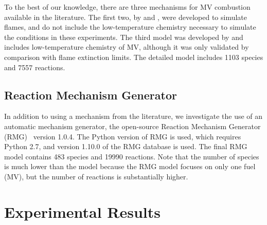 \documentclass[12pt]{../ussci}
\begin{document}
To the best of our knowledge, there are three mechanisms for MV combustion
available in the literature. The first two, by \textcite{Korobeinichev2015} and
\textcite{Dmitriev2015}, were developed to simulate flames, and do not include
the low-temperature chemistry necessary to simulate the conditions in these
experiments. The third model was developed by \textcite{Dievart2013} and
includes low-temperature chemistry of MV, although it was only validated by
comparison with flame extinction limits.
The detailed \textcite{Dievart2013} model includes 1103 species and 7557
reactions.

\subsection{Reaction Mechanism Generator}\label{sec:reaction-mechanism-generator}

In addition to using a mechanism from the literature, we investigate the use of
an automatic mechanism generator, the open-source Reaction Mechanism Generator
(RMG)~\autocite{Allen2012} version 1.0.4. The Python version of RMG is used,
which requires Python 2.7, and version 1.10.0 of the RMG database is used. The
final RMG model contains 483 species and 19990 reactions. Note that the number
of species is much lower than the \textcite{Dievart2013} model because the RMG
model focuses on only one fuel (MV), but the number of reactions is
substantially higher.

\section{Experimental Results}\label{sec:experimental-results}
\end{document}
